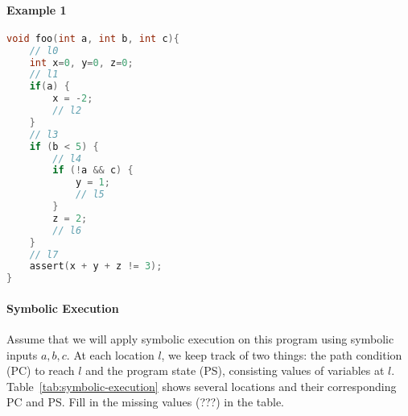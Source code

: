 \documentclass[10pt]{article}
\begin{document}
\paragraph{Example 1}
\begin{lstlisting}[language=c]
void foo(int a, int b, int c){    
    // l0
    int x=0, y=0, z=0;
    // l1
    if(a) {        
        x = -2;
        // l2
    }
    // l3
    if (b < 5) {
        // l4 
        if (!a && c) {            
            y = 1; 
            // l5
        }        
        z = 2;
        // l6 
    }
    // l7
    assert(x + y + z != 3);
}
\end{lstlisting}

\paragraph{Symbolic Execution} Assume that we will apply symbolic execution on this program using symbolic inputs $a, b, c$.  At each location $l$,  we keep track of two things: the path condition (PC) to reach $l$ and the program state (PS), consisting values of variables at $l$. Table~\ref{tab:symbolic-execution} shows several locations and their corresponding PC and PS.  Fill in the missing values (???) in the table.
\end{document}
